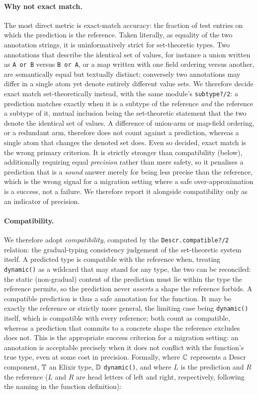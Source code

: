 \paragraph{Why not exact match.}
The most direct metric is exact-match accuracy: the fraction of test entries on which the prediction is the reference.
Taken literally, as equality of the two annotation strings, it is uninformatively strict for set-theoretic types.
Two annotations that describe the identical set of values, for instance a union written as \texttt{A or B} versus \texttt{B or A}, or a map written with one field ordering versus another, are semantically equal but textually distinct; conversely two annotations may differ in a single atom yet denote entirely different value sets.
We therefore decide exact match set-theoretically instead, with the same module's \texttt{subtype?/2}: a prediction matches exactly when it is a subtype of the reference \emph{and} the reference a subtype of it, mutual inclusion being the set-theoretic statement that the two denote the identical set of values.
A difference of union-arm or map-field ordering, or a redundant arm, therefore does not count against a prediction, whereas a single atom that changes the denoted set does.
Even so decided, exact match is the wrong primary criterion.
It is strictly stronger than compatibility (below), additionally requiring equal \emph{precision} rather than mere safety, so it penalises a prediction that is a \emph{sound} answer merely for being less precise than the reference, which is the wrong signal for a migration setting where a safe over-approximation is a success, not a failure.
We therefore report it alongside compatibility only as an indicator of precision.

\paragraph{Compatibility.}
We therefore adopt \emph{compatibility}, computed by the \texttt{Descr.compatible?/2} relation: the gradual-typing consistency judgement of the set-theoretic system itself.
A predicted type is compatible with the reference when, treating \texttt{dynamic()} as a wildcard that may stand for any type, the two can be reconciled: the static (non-gradual) content of the prediction must lie within the type the reference permits, so the prediction never \emph{asserts} a shape the reference forbids.
A compatible prediction is thus a safe annotation for the function.
It may be exactly the reference or strictly more general, the limiting case being \texttt{dynamic()} itself, which is compatible with every reference; both count as compatible, whereas a prediction that commits to a concrete shape the reference excludes does not.
This is the appropriate success criterion for a migration setting: an annotation is acceptable precisely when it does not conflict with the function's true type, even at some cost in precision.
Formally, where $\mathbb{C}$ represents a Descr component, $\mathbb{T}$ an Elixir type, $\mathbb{D}$ \texttt{dynamic()}, and where $L$ is the prediction and $R$ the reference ($L$ and $R$ are head letters of left and right, respectively, following the naming in the function definition):

